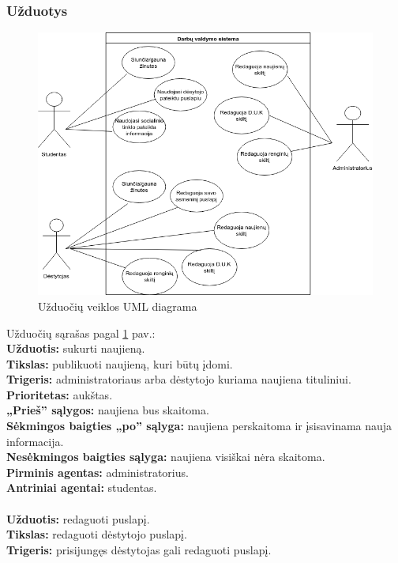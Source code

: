 \documentclass{VUMIFPSkursinis}
\begin{document}
\subsubsection{Užduotys}
\begin{figure}[H]
\centering
\includegraphics[width=\linewidth]{img/DVS.png}
\caption{Užduočių veiklos UML diagrama}
\label{fig:dvs}
\end{figure}
Užduočių sąrašas pagal \ref{fig:dvs} pav.:\\
\textbf{Užduotis:} sukurti naujieną. \\
\textbf{Tikslas:} publikuoti naujieną, kuri būtų įdomi.\\
\textbf{Trigeris:} administratoriaus arba dėstytojo kuriama naujiena tituliniui. \\
\textbf{Prioritetas:} aukštas. \\
\textbf{„Prieš” sąlygos:} naujiena bus skaitoma.\\
\textbf{Sėkmingos baigties „po” sąlyga:} naujiena perskaitoma ir įsisavinama nauja informacija. \\
\textbf{Nesėkmingos baigties sąlyga:} naujiena visiškai nėra skaitoma. \\
\textbf{Pirminis agentas:} administratorius. \\
\textbf{Antriniai agentai:} studentas. \\
\\
\textbf{Užduotis:} redaguoti puslapį. \\
\textbf{Tikslas:} redaguoti dėstytojo puslapį.\\
\textbf{Trigeris:} prisijungęs dėstytojas gali redaguoti puslapį. \\
\end{document}
